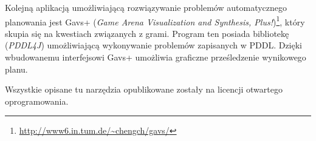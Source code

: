Kolejną aplikacją umożliwiającą rozwiązywanie problemów automatycznego planowania jest Gavs+ (\textit{Game Arena Visualization and Synthesis, Plus!})\footnote{\url{http://www6.in.tum.de/~chengch/gavs/}}, który skupia się na kwestiach związanych z grami. Program ten posiada bibliotekę (\textit{PDDL4J}) umożliwiającą wykonywanie problemów zapisanych w PDDL. Dzięki wbudowanemu interfejsowi Gavs+ umożliwia graficzne prześledzenie wynikowego planu.

Wszystkie opisane tu narzędzia opublikowane zostały na licencji otwartego oprogramowania.

